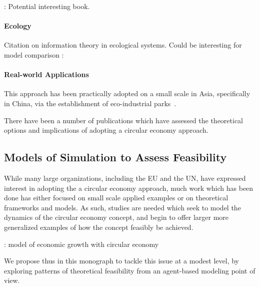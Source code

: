 \documentclass[fleqn,10pt]{wlscirep}
\begin{document}
\cite{may1973stability} : Potential interesting book.



\paragraph{Ecology}


Citation on information theory in ecological systems. Could be interesting for model comparison : \cite{ulanowicz1991ecosystem}






\paragraph{Real-world Applications}

This approach has been practically adopted on a small scale in Asia, specifically in China, via the establishment of eco-industrial parks~\cite{geng2013measuring}.

There have been a number of publications which have assessed the theoretical options and implications of adopting a circular economy approach. 




\subsection*{Models of Simulation to Assess Feasibility}


While many large organizations, including the EU and the UN,  have expressed interest in adopting the a circular economy approach, much work which has been done has either focused on small scale applied examples or on theoretical frameworks and models. As such, studies are needed which seek to model the dynamics of the circular economy concept, and begin to offer larger more generalized examples of how the concept feasibly be achieved. 


\cite{george2015circular} : model of economic growth with circular economy


We propose thus in this monograph to tackle this issue at a modest level, by exploring patterns of theoretical feasibility from an agent-based modeling point of view. 
\end{document}
